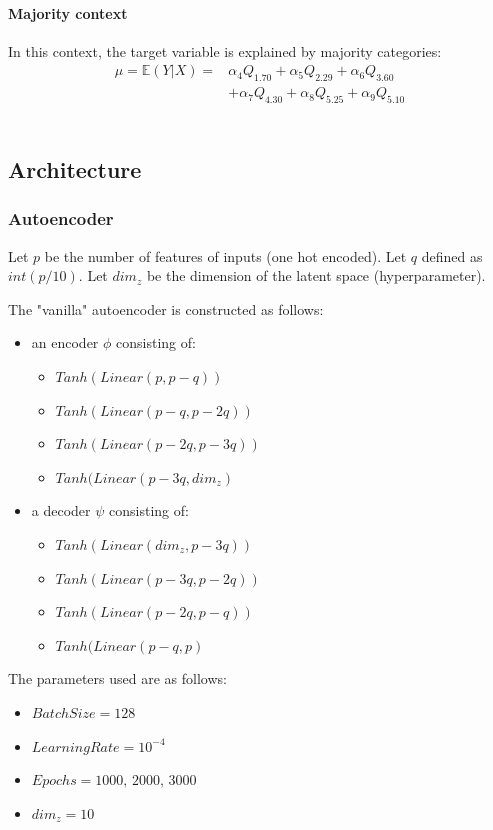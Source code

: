 \documentclass{article}
\theoremstyle{definition}
\begin{document}
\paragraph{Majority context}
In this context, the target variable is explained by majority categories: 
{\small
\begin{align*}
    \mu  = \mathbb{E}(Y|X)=& \alpha_4 Q_1.70 + \alpha_5  Q_2.29 + \alpha_6 Q_3.60 \\ & +  \alpha_7 Q_4.30  + \alpha_8 Q_5.25 + \alpha_9 Q_5.10
\end{align*}
}%
\\
\subsection{Architecture} 
\subsubsection{Autoencoder}
\label{AE_archi}
Let $p$ be the number of features of inputs (one hot encoded). Let $q$ defined as $int(p/10)$. Let $dim_z$ be the dimension of the latent space (hyperparameter).

The "vanilla" autoencoder is constructed as follows: 
\begin{itemize}
    \item an encoder $\phi$ consisting of:
    \begin{itemize}
        \item $Tanh(Linear(p,p-q))$
        \item $Tanh(Linear(p-q,p-2q))$
        \item $Tanh(Linear(p-2q,p-3q))$
        \item $Tanh(Linear(p-3q,dim_z)$
    \end{itemize}
    \item a decoder $\psi$ consisting of:
    \begin{itemize}
        \item $Tanh(Linear(dim_z,p-3q))$
        \item $Tanh(Linear(p-3q,p-2q))$
        \item $Tanh(Linear(p-2q,p-q))$
        \item $Tanh(Linear(p-q,p)$
    \end{itemize}
\end{itemize}

The parameters used are as follows:

\begin{itemize}
    \item $BatchSize = 128$
    \item $LearningRate = 10^{-4}$
    \item $Epochs = 1000, \, 2000, \, 3000$
    \item $dim_z = 10$
\end{itemize}
\end{document}
